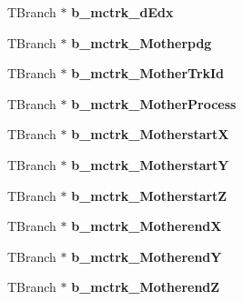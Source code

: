\begin{DoxyCompactItemize}
\item 
\hypertarget{classanatree_a63d535230d2f490ef8bc1e7b874637b3}{T\-Branch $\ast$ {\bfseries b\-\_\-mctrk\-\_\-d\-Edx}}\label{classanatree_a63d535230d2f490ef8bc1e7b874637b3}

\item 
\hypertarget{classanatree_acea854d8fad6395b5c8286c81faaadcf}{T\-Branch $\ast$ {\bfseries b\-\_\-mctrk\-\_\-\-Motherpdg}}\label{classanatree_acea854d8fad6395b5c8286c81faaadcf}

\item 
\hypertarget{classanatree_afd83c84356ab31c63a0c8222b5438f01}{T\-Branch $\ast$ {\bfseries b\-\_\-mctrk\-\_\-\-Mother\-Trk\-Id}}\label{classanatree_afd83c84356ab31c63a0c8222b5438f01}

\item 
\hypertarget{classanatree_ae713955ec1fa45958af685f89f1389e5}{T\-Branch $\ast$ {\bfseries b\-\_\-mctrk\-\_\-\-Mother\-Process}}\label{classanatree_ae713955ec1fa45958af685f89f1389e5}

\item 
\hypertarget{classanatree_afddc365fe60223e0dea0fba73db44429}{T\-Branch $\ast$ {\bfseries b\-\_\-mctrk\-\_\-\-Motherstart\-X}}\label{classanatree_afddc365fe60223e0dea0fba73db44429}

\item 
\hypertarget{classanatree_aaf83854ebe15c8fec5bccbca5dc2a0a0}{T\-Branch $\ast$ {\bfseries b\-\_\-mctrk\-\_\-\-Motherstart\-Y}}\label{classanatree_aaf83854ebe15c8fec5bccbca5dc2a0a0}

\item 
\hypertarget{classanatree_a9b9cf19d8acdffafb5af6f742e2efa33}{T\-Branch $\ast$ {\bfseries b\-\_\-mctrk\-\_\-\-Motherstart\-Z}}\label{classanatree_a9b9cf19d8acdffafb5af6f742e2efa33}

\item 
\hypertarget{classanatree_a15f726987c6368ff4ee6779fc3759a27}{T\-Branch $\ast$ {\bfseries b\-\_\-mctrk\-\_\-\-Motherend\-X}}\label{classanatree_a15f726987c6368ff4ee6779fc3759a27}

\item 
\hypertarget{classanatree_a5ec07619024bbc63f7503a359540b5d3}{T\-Branch $\ast$ {\bfseries b\-\_\-mctrk\-\_\-\-Motherend\-Y}}\label{classanatree_a5ec07619024bbc63f7503a359540b5d3}

\item 
\hypertarget{classanatree_af9b73eb163d730f5dcae13c358689835}{T\-Branch $\ast$ {\bfseries b\-\_\-mctrk\-\_\-\-Motherend\-Z}}\label{classanatree_af9b73eb163d730f5dcae13c358689835}


\end{DoxyCompactItemize}
